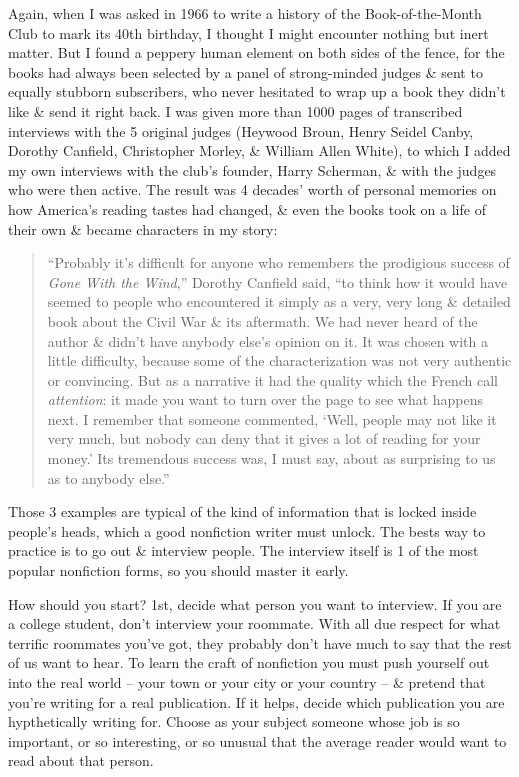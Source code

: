 \documentclass{article}
\begin{document}
Again, when I was asked in 1966 to write a history of the Book-of-the-Month Club to mark its 40th birthday, I thought I might encounter nothing but inert matter. But I found a peppery human element on both sides of the fence, for the books had always been selected by a panel of strong-minded judges \& sent to equally stubborn subscribers, who never hesitated to wrap up a book they didn't like \& send it right back. I was given more than 1000 pages of transcribed interviews with the 5 original judges (Heywood Broun, Henry Seidel Canby, Dorothy Canfield, Christopher Morley, \& William Allen White), to which I added my own interviews with the club's founder, Harry Scherman, \& with the judges who were then active. The result was 4 decades' worth of personal memories on how America's reading tastes had changed, \& even the books took on a life of their own \& became characters in my story:
\begin{quotation}
	``Probably it's difficult for anyone who remembers the prodigious success of \textit{Gone With the Wind},'' Dorothy Canfield said, ``to think how it would have seemed to people who encountered it simply as a very, very long \& detailed book about the Civil War \& its aftermath. We had never heard of the author \& didn't have anybody else's opinion on it. It was chosen with a little difficulty, because some of the characterization was not very authentic or convincing. But as a narrative it had the quality which the French call \textit{attention}: it made you want to turn over the page to see what happens next. I remember that someone commented, `Well, people may not like it very much, but nobody can deny that it gives a lot of reading for your money.' Its tremendous success was, I must say, about as surprising to us as to anybody else.''
\end{quotation}
Those 3 examples are typical of the kind of information that is locked inside people's heads, which a good nonfiction writer must unlock. The bests way to practice is to go out \& interview people. The interview itself is 1 of the most popular nonfiction forms, so you should master it early.

How should you start? 1st, decide what person you want to interview. If you are a college student, don't interview your roommate. With all due respect for what terrific roommates you've got, they probably don't have much to say that the rest of us want to hear. To learn the craft of nonfiction you must push yourself out into the real world -- your town or your city or your country -- \& pretend that you're writing for a real publication. If it helps, decide which publication you are hypthetically writing for. Choose as your subject someone whose job is so important, or so interesting, or so unusual that the average reader would want to read about that person.
\end{document}
